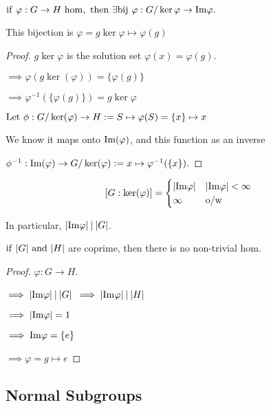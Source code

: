 \documentclass[12pt]{article}
\newcommand{\divides}{\mathbin|}
\newcommand\im{\TR{Im}}
\newcommand\vphi{\varphi}
\begin{document}
\bboxprop
\begin{prop}
    \(\iif\ \vphi:G\to H\ \TR{hom},\ \tthen\ \exists\TR{bij}\ \vphi:G/\ker\vphi\to\im\vphi.\)

    This bijection is \(\vphi=g\ker\vphi\mapsto\vphi(g)\)
\end{prop}
\ebox

\bboxproof
\begin{proof}
    \(g\ker\vphi\) is the solution set \(\vphi(x)=\vphi(g)\).

    \(\implies\vphi(g\ker(\vphi))=\{\vphi(g)\}\)

    \(\implies \vphi^{-1}(\{\vphi(g)\})=g\ker\vphi\)
    
    \(\TR{Let}\ \phi:G/\ker(\vphi)\to H:=S\mapsto\vphi(S)=\{x\}\mapsto x\)

    We know it maps onto \(\im(\vphi)\), and this function as an inverse
    
    \(\phi^{-1}:\im(\vphi)\to G/\ker(\vphi):=x\mapsto\vphi^{-1}(\{x\})\).
\end{proof}
\ebox

\bboxcoro
\begin{coro}
    \[
        [G:\ker(\vphi)]=\begin{cases}
            |\im\vphi| & |\im\vphi|<\infty \\
            \infty     & \TR{o/w}          \\
        \end{cases}
    \]

    In particular, \(|\im\vphi|\divides|G|\).
\end{coro}
\ebox

\bboxprop
\begin{prop}
    \(\mathrm{if}\ |G|\ \mathrm{and}\ |H|\) are coprime, then
    there is no non-trivial hom.
\end{prop}
\ebox

\bboxproof
\begin{proof}
    \(\vphi:G\to H\).

    \(\implies |\im\vphi|\divides|G|\)
    \(\implies |\im\vphi|\divides|H|\)

    \(\implies|\im\vphi|=1\)

    \(\implies\im\vphi=\{e\}\)

    \(\implies\vphi=g\mapsto e\)
\end{proof}
\ebox

\subsection{Normal Subgroups}
\end{document}
